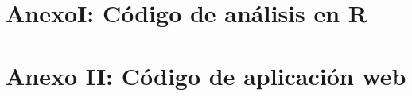 \documentclass[a4paper, 12pt]{bookln9}
\begin{document}
	\tableofcontents
		
	
	
	
	
	
	
	
	
	
    
	
	
	
	
	
	
	
	\newpage
	
	\thispagestyle{empty}
	
	
	\appendix
	\backmatter
	\chapter{AnexoI: Código de análisis en R}
	
	\chapter{Anexo II: Código de aplicación web}
	
		
\end{document}
